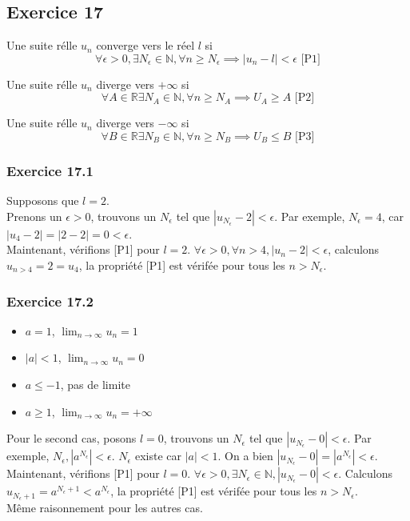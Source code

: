 \documentclass[]{book}
\theoremstyle{definition}
\newcommand{\bb}[1]{\mathbb{#1}}
\newcommand{\R}{\bb{R}}
\newcommand{\N}{\bb{N}}
\begin{document}
\subsection*{Exercice 17}
Une suite r\'elle $u_n$ converge vers le r\'eel $l$ si
$$\forall \epsilon > 0, \exists N_{\epsilon} \in \N, \forall n \geq N_{\epsilon}  \implies  |u_n -l| < \epsilon \textrm{  [P1]}$$

Une suite r\'elle $u_n$ diverge vers $+\infty$ si
$$\forall A \in \R \exists N_{A} \in \N, \forall n \geq N_{A}  \implies  U_A \geq A \textrm{  [P2]}$$

Une suite r\'elle $u_n$ diverge vers $-\infty$ si
$$\forall B \in \R \exists N_{B} \in \N, \forall n \geq N_{B}  \implies  U_B \leq B \textrm{  [P3]}$$


\subsubsection*{Exercice 17.1}
Supposons que $l=2$.\\
Prenons un $\epsilon>0$, trouvons un $N_{\epsilon}$ tel que $|u_{N_{\epsilon}} - 2| < \epsilon $. Par exemple, $N_{\epsilon} = 4$, car $|u_4 - 2| = |2-2| = 0 < \epsilon$.\\ 
Maintenant, v\'erifions [P1] pour $l=2$.
$\forall \epsilon > 0, \forall n > 4, |u_n - 2| < \epsilon$, calculons $u_{n>4} = 2 = u_4$, la propri\'et\'e [P1] est v\'erif\'ee pour tous les $n > N_{\epsilon}$.

\subsubsection*{Exercice 17.2}
\begin{itemize}
\item $a = 1$, $\lim_{n\to\infty} u_n = 1$
\item $|a| < 1$, $\lim_{n\to\infty} u_n = 0$
\item $a \leq -1$, pas de limite
\item $a \geq 1$, $\lim_{n\to\infty} u_n = +\infty$
\end{itemize}

Pour le second cas, posons $l=0$, trouvons un $N_{\epsilon}$ tel que $|u_{N_{\epsilon}} - 0| < \epsilon $. Par exemple, $N_{\epsilon}, |a^{N_{\epsilon}}| < \epsilon$. $N_{\epsilon}$ existe car $|a|<1$. On a bien $|u_{N_{\epsilon}} - 0| = |a^{N_{\epsilon}}| < \epsilon$.\\ 
Maintenant, v\'erifions [P1] pour $l=0$. 
$\forall \epsilon > 0, \exists N_{\epsilon} \in \N, |u_{N_{\epsilon}} - 0| < \epsilon$. Calculons $u_{N_{\epsilon}+1} = a^{N_{\epsilon}+1} < a^{N_{\epsilon}}$, la propri\'et\'e [P1] est v\'erif\'ee pour tous les $n> N_{\epsilon}$.\\
M\^eme raisonnement pour les autres cas.
\end{document}
